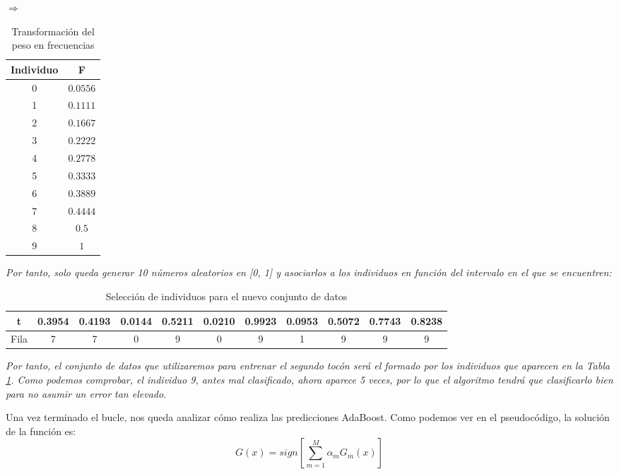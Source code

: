 \documentclass[12pt,twoside]{article}
\begin{document}
\begin{table}[h]
\centering
$\Rightarrow$
\begin{tabular}{|c|c|}
\hline
Individuo & F \\ \hline
0 & $0.0556$ \\ \hline
1 & $0.1111$ \\ \hline
2 & $0.1667$ \\ \hline
3 & $0.2222$ \\ \hline
4 & $0.2778$ \\ \hline
5 & $0.3333$ \\ \hline
6 & $0.3889$ \\ \hline
7 & $0.4444$ \\ \hline
8 & $0.5$ \\ \hline
9 & $1$ \\ \hline
\end{tabular}
\caption{Transformación del peso en frecuencias}
\end{table}

\textit{Por tanto, solo queda generar 10 números aleatorios en [0, 1] y asociarlos a los individuos en función del intervalo en el que se encuentren: }
\begin{table}[H]
\centering
\begin{tabular}{|c|c|c|c|c|c|c|c|c|c|c|}
\hline
t & 0.3954 & 0.4193 & 0.0144 & 0.5211 & 0.0210 & 0.9923 & 0.0953 & 0.5072 & 0.7743 & 0.8238 \\ \hline
Fila & 7 & 7 & 0 & 9 & 0 & 9 & 1 & 9 & 9 & 9 \\ \hline
\end{tabular}
\caption{Selección de individuos para el nuevo conjunto de datos}
\label{tab:AdaB_selec}
\end{table}

\textit{Por tanto, el conjunto de datos que utilizaremos para entrenar el segundo tocón será el formado por los individuos que aparecen en la Tabla \ref{tab:AdaB_selec}. Como podemos comprobar, el individuo 9, antes mal clasificado, ahora aparece 5 veces, por lo que el algoritmo tendrá que clasificarlo bien para no asumir un error tan elevado.}

\bigskip \bigskip


Una vez terminado el bucle, nos queda analizar cómo realiza las predicciones AdaBoost. Como podemos ver en el pseudocódigo, la solución de la función es:
\begin{equation*}
G(x) = sign \left[ \sum_{m=1}^M \alpha_m G_m(x) \right]
\end{equation*}
\end{document}
